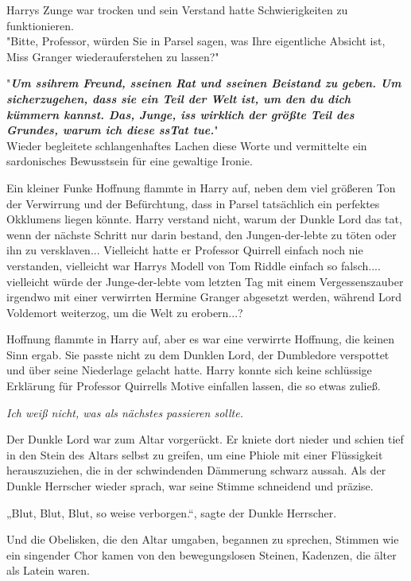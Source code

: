 {Harrys Zunge war trocken und sein Verstand hatte Schwierigkeiten zu funktionieren.\\ "Bitte, Professor, würden Sie in Parsel sagen, was Ihre eigentliche Absicht ist, Miss Granger wiederauferstehen zu lassen?"

"\textbf{\emph{Um ssihrem Freund, sseinen Rat und sseinen Beistand zu geben. Um sicherzugehen, dass sie ein Teil der Welt ist, um den du dich kümmern kannst. Das, Junge, iss wirklich der größte Teil des Grundes, warum ich diese ssTat tue.}}"\\ Wieder begleitete schlangenhaftes Lachen diese Worte und vermittelte ein sardonisches Bewusstsein für eine gewaltige Ironie.

Ein kleiner Funke Hoffnung flammte in Harry auf, neben dem viel größeren Ton der Verwirrung und der Befürchtung, dass in Parsel tatsächlich ein perfektes Okklumens liegen könnte. Harry verstand nicht, warum der Dunkle Lord das tat, wenn der nächste Schritt nur darin bestand, den Jungen-der-lebte zu töten oder ihn zu versklaven... Vielleicht hatte er Professor Quirrell einfach noch nie verstanden, vielleicht war Harrys Modell von Tom Riddle einfach so falsch.... vielleicht würde der Junge-der-lebte vom letzten Tag mit einem Vergessenszauber irgendwo mit einer verwirrten Hermine Granger abgesetzt werden, während Lord Voldemort weiterzog, um die Welt zu erobern...?

Hoffnung flammte in Harry auf, aber es war eine verwirrte Hoffnung, die keinen Sinn ergab. Sie passte nicht zu dem Dunklen Lord, der Dumbledore verspottet und über seine Niederlage gelacht hatte. Harry konnte sich keine schlüssige Erklärung für Professor Quirrells Motive einfallen lassen, die so etwas zuließ.

\emph{Ich weiß nicht, was als nächstes passieren sollte.}

Der Dunkle Lord war zum Altar vorgerückt. Er kniete dort nieder und schien tief in den Stein des Altars selbst zu greifen, um eine Phiole mit einer Flüssigkeit herauszuziehen, die in der schwindenden Dämmerung schwarz aussah. Als der Dunkle Herrscher wieder sprach, war seine Stimme schneidend und präzise.

„Blut, Blut, Blut, so weise verborgen.“, sagte der Dunkle Herrscher.

Und die Obelisken, die den Altar umgaben, begannen zu sprechen, Stimmen wie ein singender Chor kamen von den bewegungslosen Steinen, Kadenzen, die älter als Latein waren.\\

}
